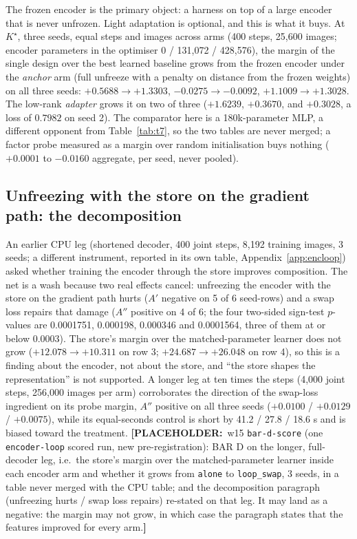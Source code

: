 \documentclass{article} %
\newcommand{\PLACEHOLDER}[1]{{\color{red}\textbf{[PLACEHOLDER:}~#1\textbf{]}}}
\newcommand{\Kstar}{\ensuremath{K^{\star}}}
\begin{document}
The frozen encoder is the primary object: a harness on top of a large encoder that is never
unfrozen. Light adaptation is optional, and this is what it buys. At $\Kstar$, three seeds,
equal steps and images across arms (400 steps, 25,600 images; encoder parameters in the
optimiser 0 / 131,072 / 428,576), the margin of the single design over the best learned
baseline grows from the frozen encoder under the \emph{anchor} arm (full unfreeze with a
penalty on distance from the frozen weights) on all three seeds: $+0.5688\to+1.3303$,
$-0.0275\to-0.0092$, $+1.1009\to+1.3028$. The low-rank \emph{adapter} grows it on two of
three ($+1.6239$, $+0.3670$, and $+0.3028$, a loss of $0.7982$ on seed 2).
The comparator here is a 180k-parameter MLP, a different opponent from Table~\ref{tab:t7}, so
the two tables are never merged; a factor probe measured as a margin over random
initialisation buys nothing ($+0.0001$ to $-0.0160$ aggregate, per seed, never pooled).

\subsection{Unfreezing with the store on the gradient path: the decomposition}
\label{sec:bard}

An earlier CPU leg (shortened decoder, 400 joint steps, 8,192 training images, 3 seeds; a
different instrument, reported in its own table, Appendix~\ref{app:encloop}) asked whether
training the encoder through the store improves composition. The net is a wash because two
real effects cancel: unfreezing the encoder with the store on the gradient path hurts ($A'$
negative on 5 of 6 seed-rows) and a swap loss repairs that damage ($A''$ positive on 4 of 6;
the four two-sided sign-test $p$-values are 0.0001751, 0.000198, 0.000346 and 0.0001564, three
of them at or below 0.0003). The store's margin over
the matched-parameter learner does not grow ($+12.078\to+10.311$ on row 3; $+24.687\to+26.048$
on row 4), so this is a finding about the encoder, not about the store, and ``the store shapes
the representation'' is not supported. %
A longer leg at ten times the steps (4,000 joint steps, 256,000 images per arm) corroborates
the direction of the swap-loss ingredient on its probe margin, $A''$ positive on all three
seeds ($+0.0100$ / $+0.0129$ / $+0.0075$), while its equal-seconds control is short by 41.2 /
27.8 / 18.6 s and is biased toward the treatment. %
\PLACEHOLDER{w15 \texttt{bar-d-score} (one \texttt{encoder-loop} scored run, new
pre-registration): BAR D on the longer, full-decoder leg, i.e.\ the store's margin over the
matched-parameter learner inside each encoder arm and whether it grows from \texttt{alone} to
\texttt{loop\_swap}, 3 seeds, in a table never merged with the CPU table; and the decomposition
paragraph (unfreezing hurts / swap loss repairs) re-stated on that leg. It may land as a
negative: the margin may not grow, in which case the paragraph states that the features
improved for every arm.}
\end{document}
